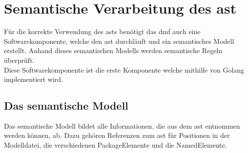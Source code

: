 \documentclass[./einleitung.tex]{subfiles}
\begin{document}
    \section{Semantische Verarbeitung des \acrfull{ast}}\label{sec:semantische-verarbeitung-des-ast}
    Für die korrekte Verwendung des \acrshort{ast}s benötigt das \acrshort{dmf} auch eine Softwarekomponente,
    welche den \acrshort{ast} durchläuft und ein semantisches Modell erstellt.
    Anhand dieses semantischen Modells werden semantische Regeln überprüft. \\

    Diese Softwarekomponente ist die erste Komponente welche mithilfe von Golang implementiert wird.

    \subsection{Das semantische Modell}\label{subsec:das-semantische-modell}
    Das semantische Modell bildet alle Informationen, die aus dem \acrshort{ast} entnommen werden können, ab.
    Dazu gehören Referenzen zum \acrshort{ast} für Positionen in der Modelldatei, die verschiedenen PackageElemente und die NamedElemente.
\end{document}
